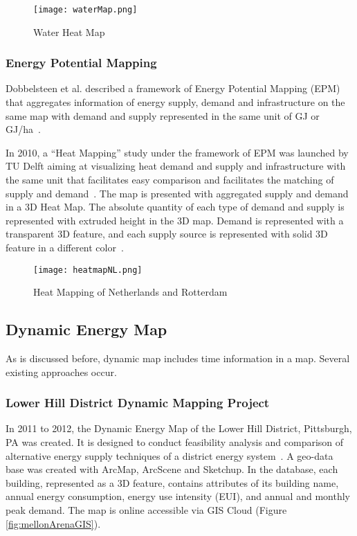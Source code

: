 \documentclass[hidelinks,12pt]{article}
\newcommand{\fref}[1]{Figure \ref{#1}}
\begin{document}
\begin{figure}[h!]
  \centering
  \texttt{[image: waterMap.png]}
  \caption{Water Heat Map~\cite{waterHeatMap}}
  \label{fig:waterMap}
\end{figure}

\subsubsection{Energy Potential Mapping}
Dobbelsteen et al. described a framework of Energy Potential Mapping
(EPM) that aggregates information of energy supply, demand and
infrastructure on the same map with demand and supply represented in
the same unit of GJ or GJ/ha~\cite{Dobbelsteen2013}.

In 2010, a ``Heat Mapping'' study under the framework of EPM was
launched by TU Delft aiming at visualizing heat demand and supply and
infrastructure with the same unit that facilitates easy comparison and
facilitates the matching of supply and
demand~\cite{Dobbelsteen2013}. The map is presented with aggregated
supply and demand in a 3D Heat Map. The absolute quantity of each type
of demand and supply is represented with extruded height in the 3D
map. Demand is represented with a transparent 3D feature, and each
supply source is represented with solid 3D feature in a different
color~\cite{Dobbelsteen2013}.

\begin{figure}[htbp]
  \centering
  \texttt{[image: heatmapNL.png]}
  \caption{Heat Mapping of Netherlands and
    Rotterdam~\cite{Dobbelsteen2013}}
  \label{fig:heatmapNL}
\end{figure}

\subsection{Dynamic Energy Map}\label{dynamicMap}
As is discussed before, dynamic map includes time information in a
map. Several existing approaches occur.

\subsubsection{Lower Hill District Dynamic Mapping Project}
In 2011 to 2012, the Dynamic Energy Map of the Lower Hill District,
Pittsburgh, PA was created. It is designed to conduct feasibility
analysis and comparison of alternative energy supply techniques of a
district energy system~\cite{baird2014, Ramesh2013}. A geo-data base
was created with ArcMap, ArcScene and Sketchup. In the database, each
building, represented as a 3D feature, contains attributes of its
building name, annual energy consumption, energy use intensity (EUI),
and annual and monthly peak demand. The map is online accessible via
GIS Cloud (\fref{fig:mellonArenaGIS}).
\end{document}
